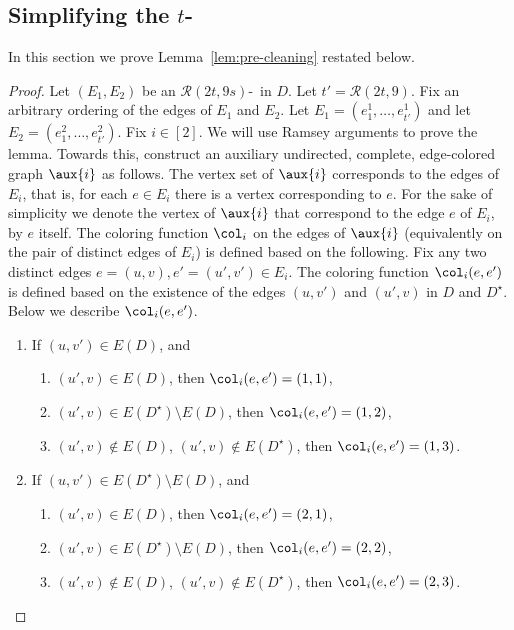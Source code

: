 \subsection{Simplifying the $t$-\toughpair}\label{sec:firstramsey}

In this section we prove Lemma~\ref{lem:pre-cleaning} restated below.
\firstramsey*

\begin{proof}
Let $(E_1,E_2)$ be an $ \mathcal{R}(2t,9s)$-\toughpair\ in $D$.
Let $t' =\mathcal{R}(2t,9)$.
 Fix an arbitrary ordering of the edges of $E_1$ and $E_2$.  Let $E_1=(e^1_1, \ldots, e^1_{t'})$ and let $E_2=(e^2_1, \ldots, e^2_{t'})$.
Fix $i \in [2]$. We will use Ramsey arguments to prove the lemma. Towards this, construct an auxiliary undirected, complete, edge-colored graph $\aux{i}$ as follows. The vertex set of $\aux{i}$ corresponds to the edges of $E_i$, that is, for each $e \in E_i$ there is a vertex corresponding to $e$.
For the sake of simplicity we denote the vertex of $\aux{i}$ that correspond to the edge $e$ of $E_i$, by $e$ itself.
The coloring function $\col_i$ on the edges of $\aux{i}$ (equivalently on the pair of distinct edges of $E_i$) is defined based on the following. Fix any two distinct edges $e=(u,v),e'=(u',v') \in E_i$. The coloring function $\col_i(e,e')$ is defined based on the existence of the edges $(u,v')$ and $(u',v)$ in $D$ and $D^{\star}$. Below we describe $\col_i(e,e')$.

\begin{enumerate}
\item If $(u,v') \in E(D)$, and
\begin{enumerate}
\item $(u',v) \in E(D)$, then $\col_i(e,e') =(1,1)$,
\item $(u',v) \in E(D^{\star}) \setminus E(D)$, then $\col_i(e,e') =(1,2)$,
\item $(u',v) \not \in E(D)$, $(u',v) \not \in E(D^{\star})$, then $\col_i(e,e') = (1,3)$.
\end{enumerate}

\item If $(u,v') \in E(D^{\star}) \setminus E(D)$, and
\begin{enumerate}
\item $(u',v) \in E(D)$, then $\col_i(e,e') =(2,1)$,
\item $(u',v) \in E(D^{\star}) \setminus E(D)$, then $\col_i(e,e') =(2,2)$,
\item $(u',v) \not \in E(D)$, $(u',v) \not \in E(D^{\star})$, then $\col_i(e,e') = (2,3)$.
\end{enumerate}


\end{enumerate}
\end{proof}
